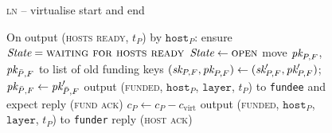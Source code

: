\begin{figure}[H]
\begin{processbox}{\textsc{ln} -- virtualise start and end}
\begin{algorithmic}[1]
      \State On output (\textsc{hosts ready}, $t_P$) by $\texttt{host}_P$:
      \label{code:ln:virtualise:start-end:hosts-ready}
      \Indent
        \State ensure $\itistate = \textsc{waiting for hosts ready}$
        \State $\itistate \gets \textsc{open}$
        \State move $\textit{pk}_{P, F}$, $\textit{pk}_{\bar{P}, F}$ to list of old funding keys
        \State $(\textit{sk}_{P, F}, \textit{pk}_{P, F}) \gets (\textit{sk}_{P, F}', \textit{pk}_{P, F}')$;
        $\textit{pk}_{\bar{P}, F} \gets \textit{pk}_{\bar{P}, F}'$
         
          \State output (\textsc{funded}, $\texttt{host}_P$, $\texttt{layer}$,
          $t_P$) to \texttt{fundee} and expect reply (\textsc{fund ack})
          \label{code:ln:virtualise:start-end:helper-output-funded}
         
          \State $c_P \gets c_P - c_{\mathrm{virt}}$
          \label{code:ln:virtualise:start-end:reduce-coins}
          \State output (\textsc{funded}, $\texttt{host}_P$, $\texttt{layer}$,
          $t_P$) to \texttt{funder} 
          \label{code:ln:virtualise:start-end:funder-funded}
        \EndIf
        \State reply (\textsc{host ack})
        \label{code:ln:virtualise:start-end:reply}
      \EndIndent
    \end{algorithmic}
  \end{processbox}
  \caption{}
  \label{code:ln:virtualise:start-end}
\end{figure}


